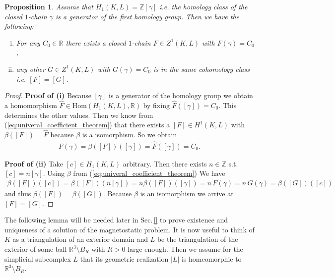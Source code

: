\documentclass[12pt,a4paper]{article}
\numberwithin{equation}{subsection}
\numberwithin{lemma}{subsection}
\newtheorem{proposition}[lemma]{Proposition}
\theoremstyle{definition}
\newcommand{\integers}{\mathbb{Z}}
\newcommand{\real}{\mathbb{R}}
\begin{document}
\begin{proposition}
    Assume that $H_1(K,L) = \integers [\gamma]$ i.e. the homology class of the 
    closed $1$-chain $\gamma$ is a generator of the first homology group.
    Then we have the following:
    \begin{enumerate}[(i)]
        \item For any $C_0 \in \real$ there exists a closed $1$-chain 
            $F \in Z^1(K,L)$ with $F(\gamma) = C_0$,
        \item any other $G \in Z^1(K,L)$ with $G(\gamma) = C_0$ 
            is in the same cohomology class i.e. $[F] = [G]$.
    \end{enumerate}
\end{proposition}
\begin{proof}
    \textbf{Proof of (i)} %
    Because $[\gamma]$ is a generator of the homology group we  obtain a 
    homomorphism $\hat{F} \in \text{Hom}(H_1(K,L),\real)$ by fixing
    $\hat{F}([\gamma]) = C_0$. This determines the other values.
    Then we know from (\ref{eq:univeral_coefficient_theorem}) that there exists
    a $[F] \in H^1(K,L)$ with $\beta([F]) = \hat{F}$ because $\beta$ is a 
    isomorphism. So we obtain
    \begin{align*}
        F(\gamma) = \beta([F])([\gamma]) = \hat{F}([\gamma]) = C_0.
    \end{align*}

    \textbf{Proof of (ii)} %
    Take $[c] \in H_1(K,L)$ arbitrary. Then there exists  $n \in \integers$ s.t.
    $[c] = n [\gamma]$.
    Using $\beta$ from (\ref{eq:univeral_coefficient_theorem})
    We have
    \begin{align*}
        \beta([F])([c]) = \beta([F])(n [\gamma]) 
        = n \beta([F])([\gamma]) = n \, F(\gamma) = n \, G(\gamma) = 
        \beta([G])([c])
    \end{align*}
    and thus $\beta([F]) = \beta([G])$. Because $\beta$ is an isomorphism
    we arrive at $[F] = [G]$.
\end{proof}

The following lemma will be needed later in Sec.\,\ref{} to prove existence 
and uniqueness of a solution of the magnetostatic problem. It is now 
useful to think of $K$ as a triangulation of an exterior domain and $L$ 
be the triangulation of the exterior of some ball $\real^3\setminus B_R$ with 
$R > 0$ large enough. Then we assume for the simplicial subcomplex $L$
that its geometric realization $|L|$ is homeomorphic to $\real^3\setminus B_R$.
\end{document}
